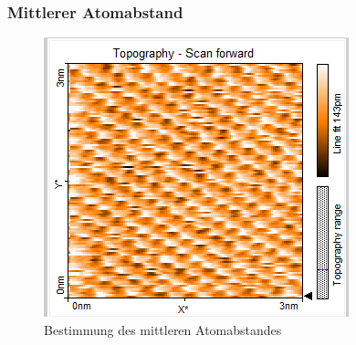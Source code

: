 \subsubsection{Mittlerer Atomabstand}
\begin{figure}[H]
\centering
\includegraphics[scale = 0.75]{graphit_3nm_nanostruktur_oberflaeche.png}
\caption{ Bestimmung des mittleren Atomabstandes }
\label{fig:mittlerer_Atomabstand}
\end{figure}